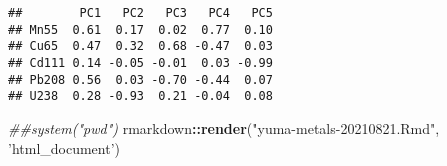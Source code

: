\documentclass[]{article}
\newenvironment{Shaded}{\begin{snugshade}}{\end{snugshade}}
\newcommand{\CommentTok}[1]{\textcolor[rgb]{0.56,0.35,0.01}{\textit{#1}}}
\newcommand{\DataTypeTok}[1]{\textcolor[rgb]{0.13,0.29,0.53}{#1}}
\newcommand{\DecValTok}[1]{\textcolor[rgb]{0.00,0.00,0.81}{#1}}
\newcommand{\KeywordTok}[1]{\textcolor[rgb]{0.13,0.29,0.53}{\textbf{#1}}}
\newcommand{\NormalTok}[1]{#1}
\newcommand{\OperatorTok}[1]{\textcolor[rgb]{0.81,0.36,0.00}{\textbf{#1}}}
\newcommand{\StringTok}[1]{\textcolor[rgb]{0.31,0.60,0.02}{#1}}
\begin{document}
\begin{Shaded}
\end{Shaded}

\begin{verbatim}
##        PC1   PC2   PC3   PC4   PC5
## Mn55  0.61  0.17  0.02  0.77  0.10
## Cu65  0.47  0.32  0.68 -0.47  0.03
## Cd111 0.14 -0.05 -0.01  0.03 -0.99
## Pb208 0.56  0.03 -0.70 -0.44  0.07
## U238  0.28 -0.93  0.21 -0.04  0.08
\end{verbatim}

\begin{Shaded}
\end{Shaded}

\begin{Shaded}
\begin{Highlighting}[]
\CommentTok{##system("pwd")}
\NormalTok{rmarkdown}\OperatorTok{::}\KeywordTok{render}\NormalTok{(}\StringTok{"yuma-metals-20210821.Rmd"}\NormalTok{, }\StringTok{'html_document'}\NormalTok{)}
\end{Highlighting}
\end{Shaded}
\end{document}
